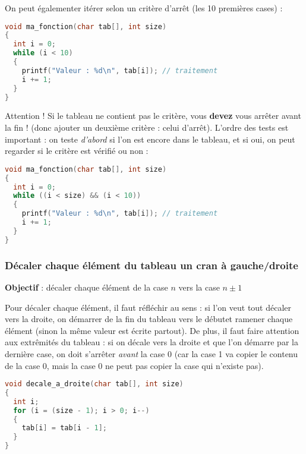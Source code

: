 \documentclass[11pt,a4paper]{article}
\begin{document}
On peut égalementer itérer selon un critère d'arrêt (les 10 premières cases) :

\medskip

\begin{lstlisting}[language=C]
void ma_fonction(char tab[], int size)
{
  int i = 0;
  while (i < 10)
  {
    printf("Valeur : %d\n", tab[i]); // traitement
    i += 1;
  }
} \end{lstlisting}



Attention ! Si le tableau ne contient pas le critère, vous \textbf{devez} vous arrêter avant la fin ! (donc ajouter un deuxième critère : celui d'arrêt).
L'ordre des tests est important : on teste \textit{d'abord} si l'on est encore dans le tableau, et si oui, on peut regarder si le critère est vérifié ou non :

\medskip

\begin{lstlisting}[language=C]
void ma_fonction(char tab[], int size)
{
  int i = 0;
  while ((i < size) && (i < 10))
  {
    printf("Valeur : %d\n", tab[i]); // traitement
    i += 1;
  }
} \end{lstlisting}


\bigskip

\subsubsection{Décaler chaque élément du tableau un cran à gauche/droite}

\textbf{Objectif} : décaler chaque élément de la case $n$ vers la case $n \pm 1$

\bigskip

Pour décaler chaque élément, il faut réfléchir au sens : si l'on veut tout décaler vers la droite, on démarrer de la fin du tableau vers le débutet ramener chaque élément (sinon la même valeur est écrite partout).
De plus, il faut faire attention aux extrêmités du tableau : si on décale vers la droite et que l'on démarre par la dernière case, on doit s'arrêter \textit{avant} la case 0 (car la case 1 va copier le contenu de la case 0, mais la case 0 ne peut pas copier la case  \fg{} qui n'existe pas).

\medskip

\begin{lstlisting}[language=C]
void decale_a_droite(char tab[], int size)
{
  int i;
  for (i = (size - 1); i > 0; i--)
  {
    tab[i] = tab[i - 1];
  }
} \end{lstlisting}
\end{document}
